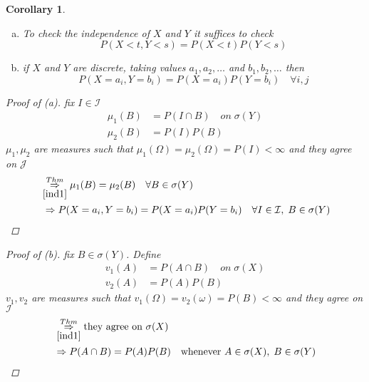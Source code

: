 \documentclass[12pt]{article}
\newtheorem{corollary}{Corollary}[section]
\begin{document}
\begin{corollary}\quad \\
\begin{enumerate}[(a)]
\item To check the independence of $X$ and $Y$ it suffices to check \[P(X<t, Y<s) = P(X<t)P(Y<s)\]
\item if $X$ and $Y$ are discrete, taking values $a_1, a_2, \dots$ and $b_1,b_2,\dots$ then
\[P(X=a_i,Y=b_i)=P(X=a_i)P(Y=b_i) \quad\forall i,j\]
\end{enumerate}

\begin{proof}[Proof of (a)] fix $I \in \mathcal{I}$
\begin{align*} \mu_1(B) &= P(I\cap B) \quad on\; \sigma(Y)\\
\mu_2(B) &= P(I)P(B) \end{align*}
 $\mu_1 , \mu_2$ are measures  such that  $\mu_1(\Omega) = \mu_2(\Omega) = P(I) < \infty$ and they agree on $\mathcal{J}$
\begin{align*}
&\overset{Thm}{\underset{\ref{ind1}}{\Rightarrow}} \mu_1(B) = \mu_2(B) \quad \forall B \in \sigma(Y)\\
&\;\Rightarrow P(X=a_i,Y=b_i)=P(X=a_i)P(Y=b_i) \quad\forall I \in \mathcal{I}, \; B \in \sigma(Y) \end{align*}
\end{proof}
\begin{proof}[Proof of (b)] fix $B \in \sigma(Y)$. Define \begin{align*}
v_1(A) &= P(A \cap B) \quad on\;\sigma(X)\\
v_2(A) &=P(A)P(B) \end{align*}
$v_1, v_2$ are measures such that $v_1(\Omega)=v_2(\omega)= P(B)<\infty$ and they agree on $\mathcal{I}$
\begin{align*}
&\overset{Thm}{\underset{\ref{ind1}}{\Rightarrow}} \text{they agree on }\sigma(X)\\
&\Rightarrow P(A\cap B) = P(A)P(B) \quad \text{whenever }A\in \sigma(X), \; B \in \sigma(Y) \end{align*}
\end{proof}
\end{corollary} 
\end{document}
